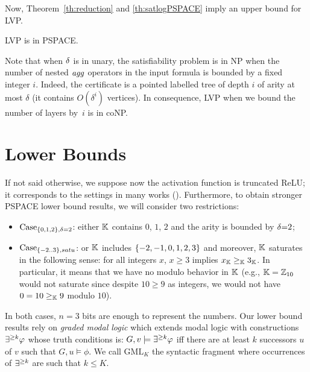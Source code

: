 Now, Theorem~\ref{th:reduction} and \ref{th:satlogPSPACE} imply an upper bound for LVP. 
\begin{corollary}
\label{cor:LVPPSPACE}
    LVP is in PSPACE.
\end{corollary}


Note that when $\delta$ is in unary, the satisfiability problem is in NP when the number of nested $\mathit{agg}$ operators in the input formula is bounded by a fixed integer $i$. Indeed, the certificate is a pointed labelled tree of depth $i$ of arity at most $\delta$ (it contains $O(\delta^i)$ vertices). In consequence, LVP when we bound the number of layers by~$i$ is in coNP.



\section{Lower Bounds}


\label{sec:lowerbound}
\newcommand{\setofvaluesforPSPACEhardaritytwo}{\set{ 0, 1, 2}}
\newcommand{\setofvaluesforPSPACEhard}{\set{-2, -1, 0, 1, 2, 3}}

\newcommand{\casezerotwoatwo}{$\text{Case}_{\set{0,1,2}, \delta=2}$}
\newcommand{\caseminustwothree}{$\text{Case}_{\set{-2..3}, satu}$}

If not said otherwise, we suppose now the activation function is truncated ReLU; it corresponds to the settings in many works (\cite{DBLP:conf/iclr/BarceloKM0RS20,ijcai2024, benedikt2024decidability}). Furthermore, to obtain stronger PSPACE lower bound results, we will consider two restrictions:
\begin{itemize}
    \item \casezerotwoatwo: either $\mathbb K$ contains $0$, $1$, $2$ %
    and the arity is bounded by $\delta{=}2$;
    \item \caseminustwothree: or $\mathbb K$ includes $\setofvaluesforPSPACEhard$ and moreover, $\mathbb K$ saturates in the following sense: for all integers $x$, $x \geq 3$ implies $x_\mathbb K \geq_\mathbb K 3_\mathbb K$. In particular, it means that we have no modulo behavior in $\mathbb K$ (e.g., $\mathbb K = \mathbb Z_{10}$ would not saturate since despite $10 \geq 9$ as integers, we would not have $0 = 10 \geq_\mathbb K 9$ modulo $10$).
\end{itemize}
In both cases, $n=3$ bits are enough to represent the numbers.
Our lower bound results rely on \emph{graded modal logic} which extends modal logic with constructions $\exists^{\geq k} \varphi$ whose truth conditions is:
    $G, v \models \exists^{\geq k} \varphi$  iff there are at least $k$ successors $u$ of $v$ such that $G, u \models \phi$.
We call $\text{GML}_K$ the syntactic fragment 
where occurrences of $\exists^{\geq k}$ are such that $k \leq K$.




